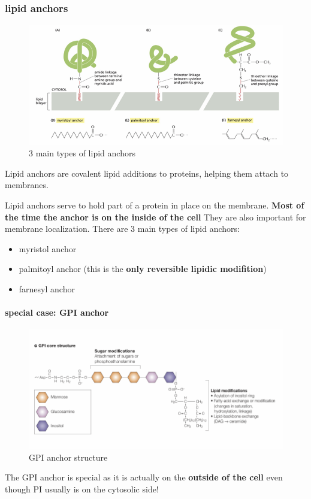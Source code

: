 \documentclass[../main.tex]{subfiles}
\begin{document}
\subsubsection{lipid anchors}
\begin{figure}[H]
    \centering
    \includegraphics[width=0.5\linewidth]{Sum_Cell_Bio_II//lectures//cbII2/lipid_anchors.png}
    \caption{3 main types of lipid anchors}
    \label{fig:enter-label}
\end{figure}
Lipid anchors are covalent lipid additions to proteins, helping them attach to membranes.
\par
Lipid anchors serve to hold part of a protein in place on the membrane. \textbf{Most of the time the anchor is on the inside of the cell} They are also important for membrane localization. There are 3 main types of lipid anchors:
\begin{itemize}
    \item myristol anchor
    \item palmitoyl anchor (this is the \textbf{only reversible lipidic modifition})
    \item farnesyl anchor
    
\end{itemize}

\paragraph{special case: GPI anchor}

\begin{figure}[H]
    \centering
    \includegraphics[width=\linewidth]{GPI.png}
    \caption{GPI anchor structure}
    \label{fig:enter-label}
\end{figure}
The GPI anchor is special as it is actually on the \textbf{outside of the cell} even though PI usually is on the cytosolic side! 
\end{document}
